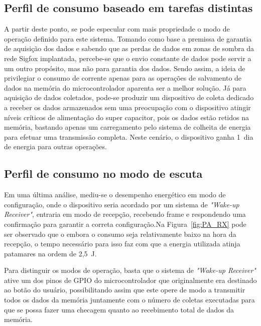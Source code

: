 \subsection{Perfil de consumo baseado em tarefas distintas}
A partir deste ponto, se pode especular com mais propriedade o modo de operação definido para este sistema. Tomando como base a premissa de garantia de aquisição dos dados e sabendo que as perdas de dados em zonas de sombra da rede Sigfox implantada, percebe-se que o envio constante de dados pode servir a um outro propósito, mas não para garantia dos dados. Sendo assim, a ideia de privilegiar o consumo de corrente apenas para as operações de salvamento de dados na memória do microcontrolador aparenta ser a melhor solução. Já para aquisição de dados coletados, pode-se produzir um dispositivo de coleta dedicado a receber os dados armazenados sem uma preocupação com o dispositivo atingir níveis críticos de alimentação do super capacitor, pois os dados estão retidos na memória, bastando apenas um carregamento pelo sistema de colheita de energia para efetuar uma transmissão completa. Neste cenário, o dispositivo ganha 1~dia de energia para outras operações.



\subsection{Perfil de consumo no modo de escuta}
Em uma última análise, mediu-se o desempenho energético em modo de configuração, onde o dispositivo seria acordado por um sistema de \textit{"Wake-up Receiver"}, entraria em modo de recepção, recebendo frame e respondendo uma confirmação para garantir a correta configuração.Na Figura~\ref{fig:PA_RX} pode ser observado que o embora o consumo seja relativamente baixo na hora da recepção, o tempo necessário para isso faz com que a energia utilizada atinja patamares na ordem de 2,5~J.

Para distinguir os modos de operação, basta que o sistema de \textit{"Wake-up Receiver"} ative um dos pinos de GPIO do microcontrolador que originalmente era destinado ao botão do usuário, possibilitando assim que este opere de modo a transmitir todos os dados da memória juntamente com o número de coletas executadas para que se possa fazer uma checagem quanto ao recebimento total de dados da memória.


